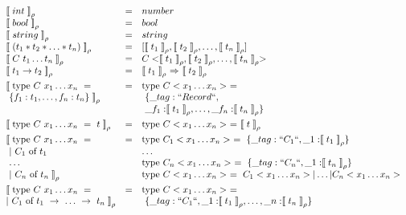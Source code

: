 \documentclass[12pt]{matmex-diploma}
\newcommand \llpar  {\mathrel{{\llbracket}}}
\newcommand \rrpar  {\mathrel{{\rrbracket}}}
\begin{document}
\clearpage

\begin{center}
$
\begin{array}{lll}
\llpar int \rrpar _{\rho} &=& number \\ 
\llpar bool \rrpar _{\rho} &=& bool \\ 
\llpar string \rrpar _{\rho}  &=& string \\ 
\llpar (t_1 * t_2 * \ldots * t_n) \rrpar _{\rho}  &=& [\llpar t_1 \rrpar _{\rho}, \llpar t_2 \rrpar _{\rho}, \ldots, \llpar t_n \rrpar _{\rho}] \\ 
\llpar C ~ t_1 \ldots t_n \rrpar _{\rho} &=& C<\llpar t_1 \rrpar _{\rho}, \llpar t_2 \rrpar _{\rho}, \ldots, \llpar t_n \rrpar _{\rho}>\\
\llpar t_1 \to t_2 \rrpar _{\rho} &=& \llpar t_1 \rrpar_{\rho}  ~=>~ \llpar t_2 \rrpar _{\rho} \\[1ex]

\llpar \mbox{type}~C~x_1 \ldots x_n ~=~ &=& \mbox{type}~C<x_1 \ldots x_n>~=\\ 
~\{f_1:t_1, \ldots, f_n:t_n\} \rrpar _{\rho} & & ~\{ \_tag: ``Record``,\\ 
& & ~ \_f_1:\llpar t_1 \rrpar _{\rho}, \ldots,\_f_n:\llpar t_n \rrpar _{\rho} \} \\[1ex] 

\llpar \mbox{type}~C~x_1 \ldots x_n ~=~t\rrpar _{\rho} &=& \mbox{type}~C<x_1 \ldots x_n>~=~\llpar t \rrpar _{\rho} \\[1ex] 

\llpar \mbox{type}~C~x_1 \ldots x_n ~= &=& \mbox{type}~C_1<x_1 \ldots x_n>~=~ \{ \_tag: ``C_1``, \_1:\llpar t_1 \rrpar _{\rho} \} \\
  ~|~C_1~\mbox{of}~t_1 & & \ldots \\
  ~\ldots & & \mbox{type}~C_n<x_1 \ldots x_n>~=~ \{ \_tag: ``C_n``, \_1:\llpar t_n \rrpar _{\rho} \} \\
  ~|~C_n~\mbox{of}~t_n \rrpar _{\rho} & &\mbox{type}~C<x_1 \ldots x_n>~=~C_1<x_1 \ldots x_n>|\ldots|C_n<x_1 \ldots x_n>\\[1ex]

\llpar \mbox{type}~C~x_1 \ldots x_n ~=&=& \mbox{type}~C<x_1 \ldots x_n>~=\\ 
|~ C_1~\mbox{of}~t_1~\to~\ldots~\to~t_n \rrpar _{\rho} & & ~\{ \_tag: ``C_1``, \_1:\llpar t_1 \rrpar _{\rho}, \ldots, \_n:\llpar t_n \rrpar _{\rho} \} 
\end{array}
$
\captionsetup{type=lstlisting}
\label{tbl:tr_types}
\end{center}
\end{document}
